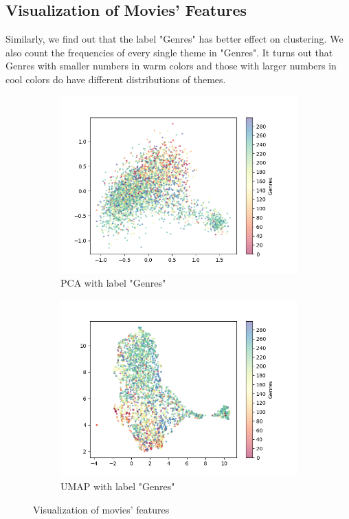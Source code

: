 \documentclass{article}
\begin{document}
\subsection{Visualization of Movies' Features}
Similarly, we find out that the label "Genres" has better effect on clustering. We also count the frequencies of every single theme in "Genres". It turns out that Genres with smaller numbers in warm colors and those with larger numbers in cool colors do have different distributions of themes.
\begin{figure}[!ht]
    \centering
    \begin{subfigure}{0.49\textwidth}
        \includegraphics[width=\textwidth]{fig/pca_genres.png}
        \caption{PCA with label "Genres"}
    \end{subfigure}
    \begin{subfigure}{0.49\textwidth}
        \includegraphics[width=\textwidth]{fig/umap_genres.png}
        \caption{UMAP with label "Genres"}
    \end{subfigure}
    \caption{Visualization of movies' features}
    \label{fig:2}
\end{figure}
\end{document}
